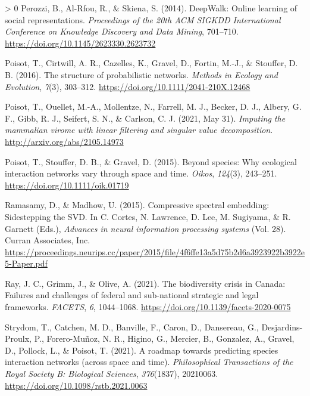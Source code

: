 \documentclass[10pt,oneside]{article}
\newlength{\cslhangindent}
\newenvironment{CSLReferences}[3] %
 {%
  \setlength{\parindent}{0pt}
  \ifodd #1 \everypar{\setlength{\hangindent}{\cslhangindent}}\ignorespaces\fi
  \ifnum #2 > 0
  \setlength{\parskip}{#2\baselineskip}
  \fi
 }%
 {}
\begin{document}
\begin{CSLReferences}{1}{0}
\leavevmode\hypertarget{ref-Perozzi2014DeeOnl}{}%
Perozzi, B., Al-Rfou, R., \& Skiena, S. (2014). DeepWalk: Online
learning of social representations. \emph{Proceedings of the 20th ACM
SIGKDD International Conference on Knowledge Discovery and Data Mining},
701--710. \url{https://doi.org/10.1145/2623330.2623732}

\leavevmode\hypertarget{ref-Poisot2016StrPro}{}%
Poisot, T., Cirtwill, A. R., Cazelles, K., Gravel, D., Fortin, M.-J., \&
Stouffer, D. B. (2016). The structure of probabilistic networks.
\emph{Methods in Ecology and Evolution}, \emph{7}(3), 303--312.
\url{https://doi.org/10.1111/2041-210X.12468}

\leavevmode\hypertarget{ref-Poisot2021ImpMam}{}%
Poisot, T., Ouellet, M.-A., Mollentze, N., Farrell, M. J., Becker, D.
J., Albery, G. F., Gibb, R. J., Seifert, S. N., \& Carlson, C. J. (2021,
May 31). \emph{Imputing the mammalian virome with linear filtering and
singular value decomposition}. \url{http://arxiv.org/abs/2105.14973}

\leavevmode\hypertarget{ref-Poisot2015SpeWhy}{}%
Poisot, T., Stouffer, D. B., \& Gravel, D. (2015). Beyond species: Why
ecological interaction networks vary through space and time.
\emph{Oikos}, \emph{124}(3), 243--251.
\url{https://doi.org/10.1111/oik.01719}

\leavevmode\hypertarget{ref-Ramasamy2015ComSpe}{}%
Ramasamy, D., \& Madhow, U. (2015). Compressive spectral embedding:
Sidestepping the SVD. In C. Cortes, N. Lawrence, D. Lee, M. Sugiyama, \&
R. Garnett (Eds.), \emph{Advances in neural information processing
systems} (Vol. 28). Curran Associates, Inc.
\url{https://proceedings.neurips.cc/paper/2015/file/4f6ffe13a5d75b2d6a3923922b3922e5-Paper.pdf}

\leavevmode\hypertarget{ref-Ray2021BioCri}{}%
Ray, J. C., Grimm, J., \& Olive, A. (2021). The biodiversity crisis in
Canada: Failures and challenges of federal and sub-national strategic
and legal frameworks. \emph{FACETS}, \emph{6}, 1044--1068.
\url{https://doi.org/10.1139/facets-2020-0075}

\leavevmode\hypertarget{ref-Strydom2021RoaPre}{}%
Strydom, T., Catchen, M. D., Banville, F., Caron, D., Dansereau, G.,
Desjardins-Proulx, P., Forero-Muñoz, N. R., Higino, G., Mercier, B.,
Gonzalez, A., Gravel, D., Pollock, L., \& Poisot, T. (2021). A roadmap
towards predicting species interaction networks (across space and time).
\emph{Philosophical Transactions of the Royal Society B: Biological
Sciences}, \emph{376}(1837), 20210063.
\url{https://doi.org/10.1098/rstb.2021.0063}


\end{CSLReferences}
\end{document}
